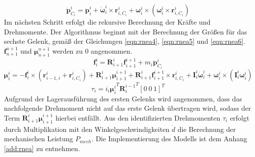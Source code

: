 %
\begin{equation}
	\label{eqn:rnea3}
	\ddot{\bm{p}}^i_{C_i} = \ddot{\bm{p}}^{i}_{i} + \dot{\bm{\omega}}^{i}_{i} \times \bm{r}^{i}_{i,C_i} + {\bm{\omega}}^{i}_{i} \times \left(  {\bm{\omega}}^{i}_{i} \times \bm{r}^{i}_{i,C_i} \right)
\end{equation}
%
Im nächsten Schritt erfolgt die rekursive Berechnung der Kräfte und Drehmomente. Der Algorithmus beginnt mit der Berechnung der Größen für das sechste Gelenk, gemäß der Gleichungen \ref{eqn:rnea4}, \ref{eqn:rnea5} und \ref{eqn:rnea6}. $\bm{f}^{n+1}_{n+1}$ und $\bm{\mu}^{n+1}_{n+1}$ werden zu 0 angenommen. 
%
\begin{equation}
	\label{eqn:rnea4}
	\bm{f}^{i}_{i} = \bm{R}^{i}_{i+1} \bm{f}^{i+1}_{i+1} + m_i\ddot{\bm{p}}^{i}_{C_i}
\end{equation}
%
\begin{equation}
	\label{eqn:rnea5}
	\bm{\mu}^{i}_{i} = -\bm{f}^{i}_{i} \times \left( \bm{r}^{i}_{i-1,i} + \bm{r}^{i}_{i,C_i} \right) + \bm{R}^{i}_{i+1} \bm{\mu}^{i+1}_{i+1} + \bm{R}^{i}_{i+1} \bm{f}^{i+1}_{i+1} \times \bm{r}^{i}_{i,C_i} + \bm{I}^{i}_{i} \dot{\bm{\omega}}^{i}_{i} + {\bm{\omega}}^{i}_{i} \times (\bm{I}^{i}_{i}{\bm{\omega}}^{i}_{i})
\end{equation}
\begin{equation}
	\label{eqn:rnea6}
	\tau_i = i_i{\bm{\mu}^{i}_{i}}^T {\bm{R}^{i-1}_{i}}^T [0~0~1]^T
\end{equation}
%
Aufgrund der Lagerausführung des ersten Gelenks wird angenommen, dass das nachfolgende Drehmoment nicht auf das erste Gelenk übertragen wird, sodass der Term $\bm{R}^{i}_{i+1} \bm{\mu}^{i+1}_{i+1}$ hierbei entfällt. Aus den identifizierten Drehmomenten $\tau_i$ erfolgt durch Multiplikation mit den Winkelgeschwindigkeiten $\dot{{d}}$ die Berechnung der mechanischen Leistung $P_{mech}$. Die Implementierung des Modells ist dem Anhang \ref{add:rnea} zu entnehmen. \cite[S.~282~ff.]{Grimble.2009}
%
